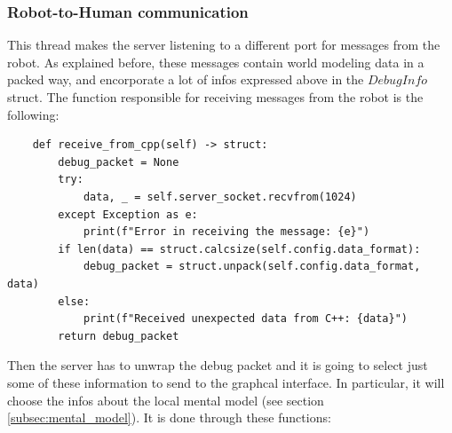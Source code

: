 \documentclass[a4paper, onecolumn, 12pt]{article}
\begin{document}
\subsubsection{Robot-to-Human communication}
This thread makes the server listening to a different port for messages from the 
robot. As explained before, these messages contain world modeling data in
a packed way, and encorporate a lot of infos expressed above in the $DebugInfo$ struct.
The function responsible for receiving messages from the robot is the following:
\begin{verbatim}
    def receive_from_cpp(self) -> struct:
        debug_packet = None
        try:    
            data, _ = self.server_socket.recvfrom(1024)
        except Exception as e:
            print(f"Error in receiving the message: {e}")
        if len(data) == struct.calcsize(self.config.data_format):
            debug_packet = struct.unpack(self.config.data_format, data)
        else:
            print(f"Received unexpected data from C++: {data}")
        return debug_packet
\end{verbatim}

Then the server has to unwrap the debug packet and it is going to select just some of these information
to send to the graphcal interface. In particular, it will choose the infos about the 
local mental model (see section \ref{subsec:mental_model}). It is done through these functions:
\end{document}

